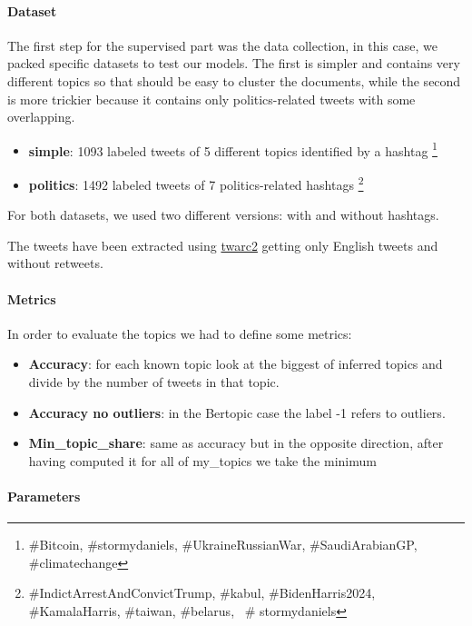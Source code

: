 \paragraph{Dataset}

The first step for the supervised part was the data collection, in this case, we packed specific datasets to test our models. The first is simpler and contains very different topics so that should be easy to cluster the documents, while the second is more trickier because it contains only politics-related tweets with some overlapping.

\begin{itemize}
    \item \textbf{simple}: 1093 labeled tweets of 5 different topics identified by a hashtag \footnote{\#Bitcoin, \#stormydaniels, \#UkraineRussianWar, \#SaudiArabianGP, \#climatechange}
    \item \textbf{politics}: 1492 labeled tweets of 7 politics-related hashtags \footnote{\#IndictArrestAndConvictTrump, \#kabul, \#BidenHarris2024, \#KamalaHarris, \#taiwan, \#belarus,  \# stormydaniels}
\end{itemize}


For both datasets, we used two different versions: with and without hashtags.

The tweets have been extracted using \href{https://twarc-project.readthedocs.io/en/latest/twarc2_en_us/}{twarc2} getting only English tweets and without retweets.

\paragraph{Metrics}
In order to evaluate the topics we had to define some metrics:

\begin{itemize}
    \item \textbf{Accuracy}: for each known topic look at the biggest of inferred topics and divide by the number of tweets in that topic.
    \item \textbf{Accuracy no outliers}: in the Bertopic case the label -1 refers to outliers.
    \item \textbf{Min\_topic\_share}:  same as accuracy but in the opposite direction, after having computed it for all of my\_topics we take the minimum
\end{itemize}


\paragraph{Parameters}


